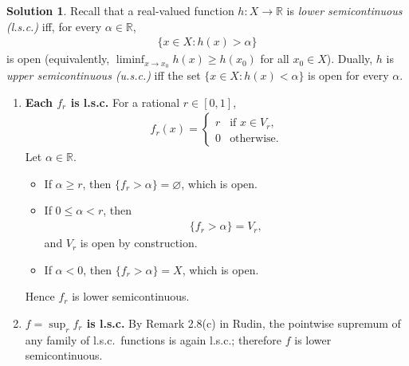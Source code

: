 \documentclass[12pt]{article}
\title{}
\author{Jerich Lee}
\date{\today}
\theoremstyle{definition} %
\newtheorem{solution}{Solution}
\theoremstyle{plain} %
\begin{document}
\maketitle
\begin{solution}
  Recall that a real-valued function $h:X\to\mathbb{R}$ is  
  \emph{lower semicontinuous (l.s.c.)} iff, for every $\alpha\in\mathbb{R}$,
  \begin{align*}
    \{x\in X : h(x)>\alpha\}
  \end{align*}
  is open (equivalently, $\displaystyle\liminf_{x\to x_0}h(x)\ge h(x_0)$ for all $x_0\in X$).  
  Dually, $h$ is \emph{upper semicontinuous (u.s.c.)} iff the set  
  $\{x\in X : h(x)<\alpha\}$ is open for every $\alpha$.
  
  \begin{enumerate}
      \item \textbf{Each $f_r$ is l.s.c.}\;
            For a rational $r\in[0,1]$,
            \begin{align*}
                f_r(x)=
                \begin{cases}
                    r & \text{if } x\in V_r,\\[2pt]
                    0 & \text{otherwise.}
                \end{cases}
            \end{align*}
            Let $\alpha\in\mathbb{R}$.
            \begin{itemize}
                \item If $\alpha\ge r$, then $\{f_r>\alpha\}=\varnothing$, which is open.
                \item If $0\le\alpha<r$, then
                      \begin{align*}
                          \{f_r>\alpha\}=V_r,
                      \end{align*}
                      and $V_r$ is open by construction.
                \item If $\alpha<0$, then $\{f_r>\alpha\}=X$, which is open.
            \end{itemize}
            Hence $f_r$ is lower semicontinuous.
  
      \item \textbf{$f=\sup_{r} f_r$ is l.s.c.}\;
            By Remark 2.8(c) in Rudin, the pointwise supremum of any family of l.s.c.\ functions is again l.s.c.; therefore $f$ is lower semicontinuous.
  

\end{enumerate}
\end{solution}
\end{document}
